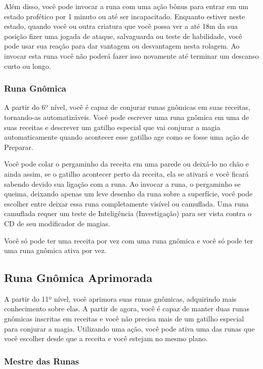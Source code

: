 \begin{multicols}{2}
Além disso, você pode invocar a runa com uma ação bônus para entrar em um estado
profético por 1 minuto ou até ser incapacitado. Enquanto estiver neste estado,
quando você ou outra criatura que você possa ver a até 18m da sua posição fizer
uma jogada de ataque, salvaguarda ou teste de habilidade, você pode usar sua
reação para dar vantagem ou desvantagem nesta rolagem. Ao invocar esta runa você
não poderá fazer isso novamente até terminar um descanso curto ou longo.

\subsubsection*{Runa Gnômica}%

A partir do 6º nível, você é capaz de conjurar runas gnômicas em suas receitas,
tornando-as automatizáveis. Você pode escrever uma runa gnômica em uma de suas
receitas e descrever um gatilho especial que vai conjurar a magia
automaticamente quando acontecer esse gatilho age como se fosse uma ação de
Preparar.

Você pode colar o pergaminho da receita em uma parede ou deixá-lo no chão e
ainda assim, se o gatilho acontecer perto da receita, ela se ativará e você
ficará sabendo devido sua ligação com a runa. Ao invocar a runa, o pergaminho se
queima, deixando apenas um leve desenho da runa sobre a superfície, você pode
escolher entre deixar essa runa completamente visível ou camuflada. Uma runa
camuflada requer um teste de Inteligência (Investigação) para ser vista contra o
CD de seu modificador de magias.

Você só pode ter uma receita por vez com uma runa gnômica e você só pode ter uma
runa gnômica ativa por vez.

\subsection*{Runa Gnômica Aprimorada}%

A partir do 11º nível, você aprimora suas runas gnômicas, adquirindo mais
conhecimento sobre elas. A partir de agora, você é capaz de manter duas runas
gnômicas inscritas em receitas e você não precisa mais de um gatilho especial
para conjurar a magia. Utilizando uma ação, você pode ativa uma das runas que
você escolher desde que a receita e você estejam no mesmo plano.

\subsubsection*{Mestre das Runas}%


\end{multicols}
